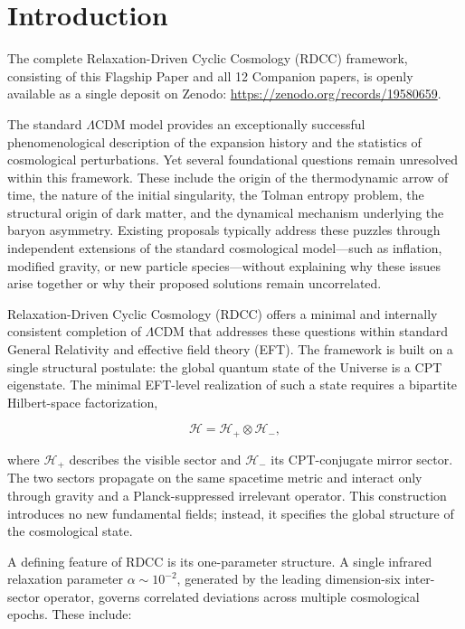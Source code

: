 \documentclass[11pt,a4paper]{article}
\begin{document}
\clearpage

\section{Introduction}

The complete Relaxation-Driven Cyclic Cosmology (RDCC) framework, consisting of this Flagship Paper and all 12 Companion papers, is openly available as a single deposit on Zenodo: \href{https://zenodo.org/records/19580659}{https://zenodo.org/records/19580659}.
\vspace{1.0cm} 

The standard \(\Lambda\)CDM model provides an exceptionally successful
phenomenological description of the expansion history and the statistics of
cosmological perturbations. Yet several foundational questions remain unresolved
within this framework. These include the origin of the thermodynamic arrow of
time, the nature of the initial singularity, the Tolman entropy problem, the
structural origin of dark matter, and the dynamical mechanism underlying the
baryon asymmetry. Existing proposals typically address these puzzles through
independent extensions of the standard cosmological model—such as inflation,
modified gravity, or new particle species—without explaining why these issues
arise together or why their proposed solutions remain uncorrelated.

Relaxation-Driven Cyclic Cosmology (RDCC) offers a minimal and internally
consistent completion of \(\Lambda\)CDM that addresses these questions within
standard General Relativity and effective field theory (EFT). The framework is
built on a single structural postulate: the global quantum state of the Universe
is a CPT eigenstate. The minimal EFT-level realization of such a state requires
a bipartite Hilbert-space factorization,

\[
\mathcal{H} = \mathcal{H}_{+} \otimes \mathcal{H}_{-},
\]

where \(\mathcal{H}_{+}\) describes the visible sector and \(\mathcal{H}_{-}\) its
CPT-conjugate mirror sector. The two sectors propagate on the same spacetime
metric and interact only through gravity and a Planck-suppressed irrelevant
operator. This construction introduces no new fundamental fields; instead, it
specifies the global structure of the cosmological state.

A defining feature of RDCC is its one-parameter structure. A single infrared
relaxation parameter \(\alpha \sim 10^{-2}\), generated by the leading
dimension-six inter-sector operator, governs correlated deviations across
multiple cosmological epochs. These include:
\end{document}
